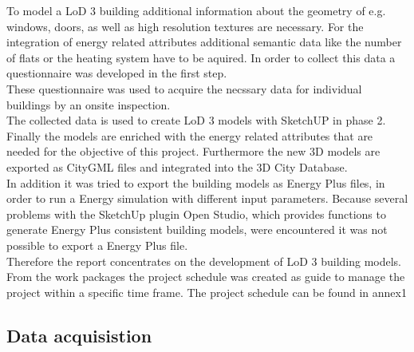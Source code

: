 To model a LoD 3 building additional information about the geometry of e.g. windows, doors, as well as high resolution textures are necessary. For the integration of energy related attributes additional semantic data like the number of flats or the heating system have to be aquired. In order to collect this data a questionnaire was developed in the first step. \\
These questionnaire was used to acquire the necssary data for individual buildings by an onsite inspection. \\
The collected data is used to create LoD 3 models with SketchUP in phase 2. 
\\
Finally the models are enriched with the energy related attributes that are needed for the objective of this project.
Furthermore the new 3D models are exported as CityGML files and integrated into the 3D City Database. \\
In addition it was tried to export the building models as Energy Plus files, in order to run a Energy simulation with different input parameters. Because several problems with the SketchUp plugin Open Studio, which provides functions to generate Energy Plus consistent building models, were encountered it was not possible to export a Energy Plus file. \\
Therefore the report concentrates on the development of LoD 3 building models. 
\\
From the work packages the project schedule was created as guide to manage the project within a specific time frame. The project schedule can be found in annex1

\subsection{Data acquisistion}
